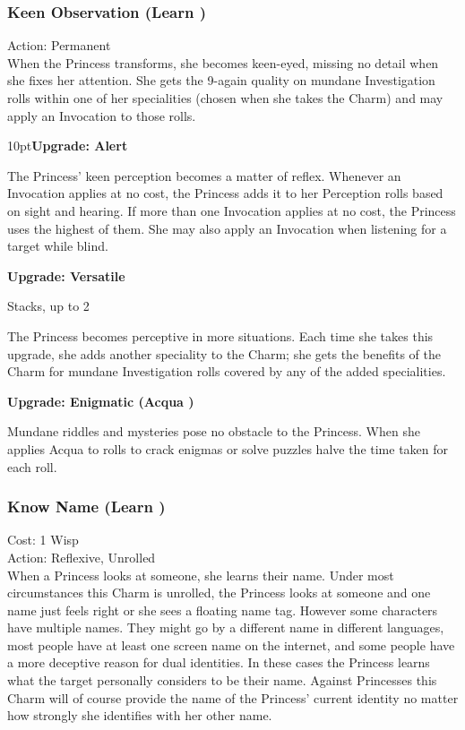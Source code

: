 \subsubsection*{Keen Observation (Learn \textbullet)}

\noindent Action: Permanent \\

\noindent When the Princess transforms, she becomes keen-eyed, missing no detail when she fixes her attention. She gets the 9-again quality on mundane Investigation rolls within one of her specialities (chosen when she takes the Charm) and may apply an Invocation to those rolls.

\begin{myindentpar}{10pt}\textbf{Upgrade: Alert}

The Princess' keen perception becomes a matter of reflex. Whenever an Invocation applies at no cost, the Princess adds it to her Perception rolls based on sight and hearing. If more than one Invocation applies at no cost, the Princess uses the highest of them. She may also apply an Invocation when listening for a target while blind.

\textbf{Upgrade: Versatile}

Stacks, up to 2

The Princess becomes perceptive in more situations. Each time she takes this upgrade, she adds another speciality to the Charm; she gets the benefits of the Charm for mundane Investigation rolls covered by any of the added specialities.

\textbf{Upgrade: Enigmatic (Acqua \textbullet\textbullet)}

Mundane riddles and mysteries pose no obstacle to the Princess. When she applies Acqua to rolls to crack enigmas or solve puzzles halve the time taken for each roll.\end{myindentpar}

\subsubsection*{Know Name (Learn \textbullet)}

\noindent Cost: 1 Wisp\\

\noindent Action: Reflexive, Unrolled\\

\noindent When a Princess looks at someone, she learns their name. Under most circumstances this Charm is unrolled, the Princess looks at someone and one name just feels right or she sees a floating name tag. However some characters have multiple names. They might go by a different name in different languages, most people have at least one screen name on the internet, and some people have a more deceptive reason for dual identities. In these cases the Princess learns what the target personally considers to be their name. Against Princesses this Charm will of course provide the name of the Princess' current identity no matter how strongly she identifies with her other name. 

